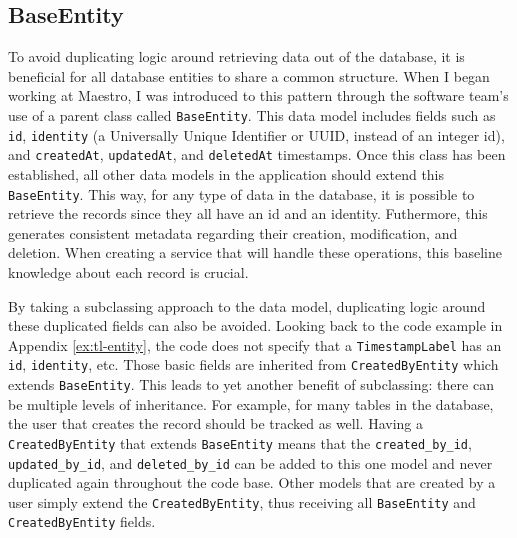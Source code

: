 \subsection{BaseEntity}

To avoid duplicating logic around retrieving data out of the database, it is beneficial for all database entities to share a common structure.  When I began working at Maestro, I was introduced to this pattern through the software team's use of a parent class called \verb!BaseEntity!.  This data model includes fields such as \verb!id!, \verb!identity! (a Universally Unique Identifier or UUID, instead of an integer id), and \verb!createdAt!, \verb!updatedAt!, and \verb!deletedAt! timestamps.  Once this class has been established, all other data models in the application should extend this \verb!BaseEntity!.  This way, for any type of data in the database, it is possible to retrieve the records since they all have an id and an identity. Futhermore, this generates consistent metadata regarding their creation, modification, and deletion. When creating a service that will handle these operations, this baseline knowledge about each record is crucial.

By taking a subclassing approach to the data model, duplicating logic around these duplicated fields can also be avoided.  Looking back to the code example in Appendix \ref{ex:tl-entity}, the code does not specify that a \verb!TimestampLabel! has an \verb!id!, \verb!identity!, etc. Those basic fields are inherited from \verb!CreatedByEntity! which extends \verb!BaseEntity!.  This leads to yet another benefit of subclassing: there can be multiple levels of inheritance. For example, for many tables in the database, the user that creates the record should be tracked as well.  Having a \verb!CreatedByEntity! that extends \verb!BaseEntity! means that the \verb!created_by_id!, \verb!updated_by_id!, and \verb!deleted_by_id! can be added to this one model and never duplicated again throughout the code base.  Other models that are created by a user simply extend the \verb!CreatedByEntity!, thus receiving all \verb!BaseEntity! and \verb!CreatedByEntity! fields.